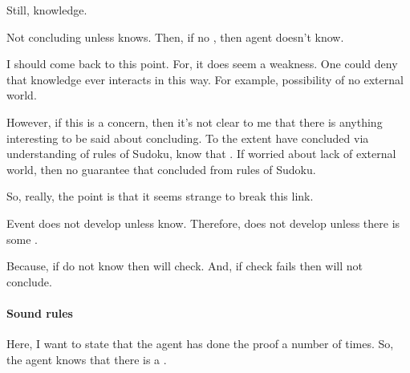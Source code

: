 \begin{note}
  Still, knowledge.

  Not concluding unless knows.
  Then, if no \pevent{}, then agent doesn't know.
  {
    \color{red}
    I should come back to this point.
    For, it does seem a weakness.
    One could deny that knowledge ever interacts in this way.
    For example, possibility of no external world.

    However, if this is a concern, then it's not clear to me that there is anything interesting to be said about concluding.
    To the extent have concluded via understanding of rules of Sudoku, know that \pevent{}.
    If worried about lack of external world, then no guarantee that concluded from rules of Sudoku.

    So, really, the point is that it seems strange to break this link.
  }

  Event does not develop unless know.
  Therefore, does not develop unless there is some \pevent{}.

  Because, if do not know then will check.
  And, if check fails then will not conclude.
\end{note}


\paragraph{Sound rules}

\begin{note}
  Here, I want to state that the agent has done the proof a number of times.
  So, the agent knows that there is a \pevent{}.
\end{note}

